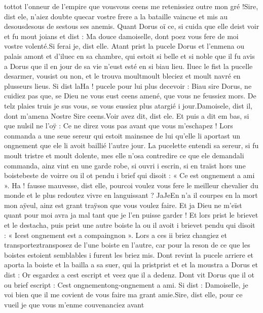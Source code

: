 \documentclass{article}
\begin{document}
\begin{pages}
      tottot l'onneur de l’empire 
      que vousvous ceens me retenissiez outre mon gré !Sire, dist ele, n’aiez doubte quecar 
      vostre frere a la bataille vaincue 
      et mis au desousdesous de 
      sestous ses anemis.
   Quant Dorus oï ce, si cuida que elle deist voir et fu mout joians et dist :
   Ma douce damoiselle, dont poez vous fere de moi vostre volenté.Si ferai je, dist elle. Atant prist 
   la pucele Dorus et l’enmena ou palais amont et 
   d’iluec en sa chambre, qui estoit si belle et si noble que il fu avis a Dorus que 
   il en jour de sa vie n’eust esté en si biau lieu. Iluec le fist 
   la pucelle desarmer, vousist ou non, et le trouva 
   moultmoult bleciez et moult navré en plusseurs lieus. 
   Si dist laHa ! pucele 
   pour lui plus decevoir :
   Biau sire Dorus, ne cuidiez pas que, se Dieu ne vous eust ceens 
      amené, que vous ne feussiez mors. De telz plaies truis je sus vous, se vous eussiez 
      plus atargié i jour.Damoisele, dist il, dont m’amena Nostre Sire ceens.Voir avez dit, dist ele. Et puis a dit em bas, si que 
   nulsil ne l’oÿ :
   Ce ne direz vous pas avant que vous m’eschapez !
   Lors conmanda a une seue sereur qui estoit 
      mainsnee de lui qu’elle li aportast un ongnement que ele li avoit baillié l’autre jour. 
   La pucelette entendi sa sereur, 
   si fu moult tristre et moult dolente, mes elle n’osa contredire ce que ele 
   demandali commanda, ainz vint en une garde robe, 
   si ouvri i escrin, si en traïst hors une 
   boistebeste de voirre ou il ot pendu i brief qui disoit :
   « Ce est ongnement a ami ». 
   Ha ! fausse mauvesse, dist elle, pourcoi voulez vous fere le meilleur 
      chevalier du monde et le plus redoutez vivre en languissant ? 
      JaJeEn n’a il courpes en la mort 
      mon aÿeul, ainz est grant traÿson que vous voulez faire. Et ja Dieu ne m’eïst quant pour moi avra 
      ja mal tant que je l’en puisse garder !
   Et lors prist le brievet et le destacha, puis prist une autre boiste la 
   ou il avoit i brievet pendu qui disoit : « Icest ongnement est 
   a compaingnon ». Lors a ces ii briez changiez et 
   transporteztransposez 
   de l’une boiste en l’autre, car pour la reson de ce que les boistes estoient semblables i furent les briez mis. \pend
\pstart Dont revint la pucele arriere et aporta la boiste 
   et la bailla a sa suer, qui la pristprist et 
   et la moustra a Dorus et dist :
   Or esgardez a cest escript et veez que il a dedenz.
   Dont vit Dorus que il ot ou brief escript : 
   Cest ongnementong-ongnement a ami. Si dist :
   Damoiselle, je voi bien que il me covient de vous faire ma grant amie.Sire, dist elle, pour ce vueil je que vous m’enme couvenanciez avant 

\end{pages}
\end{document}
